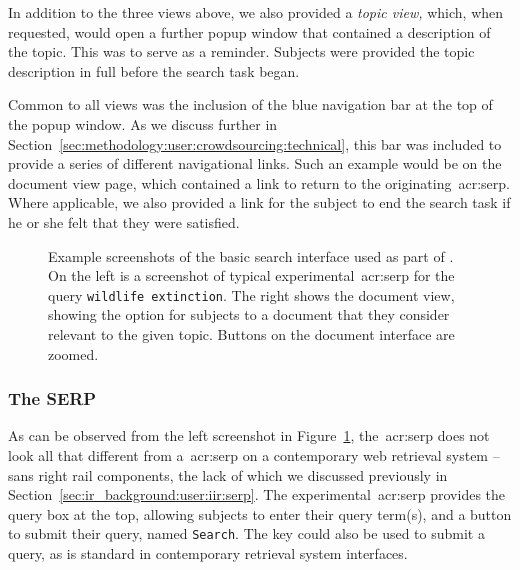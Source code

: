 In addition to the three views above, we also provided a \emph{topic view,} which, when requested, would open a further popup window that contained a description of the topic. This was to serve as a reminder. Subjects were provided the topic description in full before the search task began.

Common to all views was the inclusion of the blue navigation bar at the top of the popup window. As we discuss further in Section~\ref{sec:methodology:user:crowdsourcing:technical}, this bar was included to provide a series of different navigational links. Such an example would be on the document view page, which contained a link to return to the originating~\gls{acr:serp}. Where applicable, we also provided a link for the subject to end the search task if he or she felt that they were satisfied.

\begin{figure}[t!]
    \centering
    \caption[Example screenshots of the \treconomics~interface]{Example screenshots of the basic search interface used as part of \treconomics. On the left is a screenshot of typical experimental~\gls{acr:serp} for the query \texttt{wildlife extinction}. The right shows the document view, showing the option for subjects to  a document that they consider relevant to the given topic. Buttons on the document interface are zoomed.}
    \label{fig:interfaces}
\end{figure}

\subsubsection{The SERP}\label{sec:methodology:user:interface:serp}
As can be observed from the left screenshot in Figure~\ref{fig:interfaces}, the~\gls{acr:serp} does not look all that different from a~\gls{acr:serp} on a contemporary web retrieval system -- sans right rail components, the lack of which we discussed previously in Section~\ref{sec:ir_background:user:iir:serp}. The experimental~\gls{acr:serp} provides the query box at the top, allowing subjects to enter their query term(s), and a button to submit their query, named \texttt{Search}. The \Return key could also be used to submit a query, as is standard in contemporary retrieval system interfaces.

